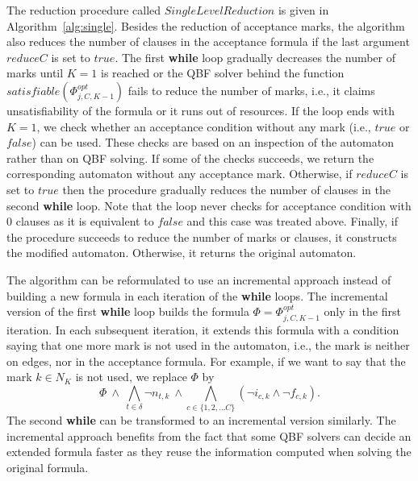 \documentclass[a4paper,UKenglish,cleveref,autoref,thm-restate]{lipics-v2021}
\def\false{\mathit{false}}
\def\true{\mathit{true}}
\begin{document}
The reduction procedure called $\mathit{SingleLevelReduction}$ is
given in Algorithm~\ref{alg:single}. Besides the reduction of
acceptance marks, the algorithm also reduces the number of clauses in the acceptance formula if the last argument $\mathit{reduceC}$ is set to
$\true$.
The first \textbf{while} loop gradually decreases the number of marks
until $K=1$ is reached or the QBF solver behind the function
$\mathit{satisfiable}(\Phi^\mathit{opt}_{j,C,K{-}1})$ fails to reduce
the number of marks, i.e., it claims unsatisfiability of the formula
or it runs out of resources. If the loop ends with $K=1$, we check
whether an acceptance condition without any mark (i.e., $\true$ or
$\false$) can be used. These checks are based on an inspection of the
automaton rather than on QBF solving. If some of the checks succeeds,
we return the corresponding automaton without any acceptance
mark. Otherwise, if $\mathit{reduceC}$ is set to $\true$ then the
procedure gradually reduces the number of clauses in the second
\textbf{while} loop. Note that the loop never checks for acceptance
condition with 0 clauses as it is equivalent to $\false$ and this case
was treated above. Finally, if the procedure succeeds to reduce the
number of marks or clauses, it constructs the modified
automaton. Otherwise, it returns the original automaton.

The algorithm can be reformulated to use an incremental approach
instead of building a new formula in each iteration of the
\textbf{while} loops. The incremental version of the first
\textbf{while} loop builds the formula
$\Phi=\Phi^\mathit{opt}_{j,C,K{-}1}$ only in the first iteration. In
each subsequent iteration, it extends this formula with a condition
saying that one more mark is not used in the automaton, i.e., the mark
is neither on edges, nor in the acceptance formula. For example, if we
want to say that the mark $k\in N_K$ is not used, we replace $\Phi$ by
\[
  \Phi~\wedge~\bigwedge_{t\in\delta}\neg n_{t,k}~\wedge\bigwedge_{c\in\{1,2,\ldots C\}}(\neg i_{c,k}\wedge\neg f_{c,k}).
\]
The second \textbf{while} can be transformed to an incremental version
similarly. The incremental approach benefits from the fact that some
QBF solvers can decide an extended formula faster as they reuse the
information computed when solving the original formula.
\end{document}
